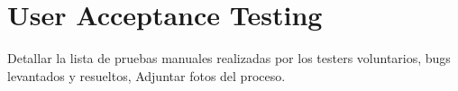 \chapter{User Acceptance Testing}
\label{cp:user-acceptance-testing}

\parindent0pt

Detallar la lista de pruebas manuales realizadas por los testers voluntarios, bugs levantados y resueltos, Adjuntar fotos del proceso.
